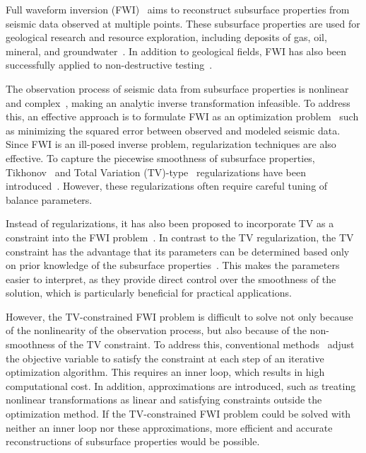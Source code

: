 Full waveform inversion (FWI)~\cite{FWI0,FWI1} aims to reconstruct subsurface properties from seismic data observed at multiple points.
These subsurface properties are used for geological research and resource exploration, including deposits of gas, oil, mineral, and groundwater~\cite{FWI1,FWIApplicationGroundwater0,FWIApplicationGroundwater1}.
In addition to geological fields, FWI has also been successfully applied to non-destructive testing~\cite{FWIApplicationNonDestructiveTesting0,FWIApplicationNonDestructiveTesting1}.

The observation process of seismic data from subsurface properties is nonlinear and complex~\cite{FWI1}, making an analytic inverse transformation infeasible.
To address this, an effective approach is to formulate FWI as an optimization problem~\cite{FWI0,CustomFWI0,CustomFWI1,CustomFWI2,CustomFWI3,CustomFWI4,CustomFWI5} such as minimizing the squared error between observed and modeled seismic data.
Since FWI is an ill-posed inverse problem, regularization techniques are also effective.
To capture the piecewise smoothness of subsurface properties, Tikhonov~\cite{tikhonov} and Total Variation (TV)-type~\cite{TV,TGV} regularizations have been introduced~\cite{FWI-with-tikhonov-regularization,FWI-with-TV-regularization,FWI-with-directional-TV-regularization,FWI-with-high-order-TV-regularization,FWI-with-TGV-regularization}.
However, these regularizations often require careful tuning of balance parameters.

Instead of regularizations, it has also been proposed to incorporate TV as a constraint into the FWI problem~\cite{FWI-with-TV-constraint,FWI-with-TV-constraint2,FWI-with-TV-constraint3}.
In contrast to the TV regularization, the TV constraint has the advantage that its parameters can be determined based only on prior knowledge of the subsurface properties~\cite{constraints-vs-penalties-in-FWI}.
This makes the parameters easier to interpret, as they provide direct control over the smoothness of the solution, which is particularly beneficial for practical applications.

However, the TV-constrained FWI problem is difficult to solve not only because of the nonlinearity of the observation process, but also because of the non-smoothness of the TV constraint.
To address this, conventional methods~\cite{FWI-with-TV-constraint,FWI-with-TV-constraint2,FWI-with-TV-constraint3} adjust the objective variable to satisfy the constraint at each step of an iterative optimization algorithm.
This requires an inner loop, which results in high computational cost.
In addition, approximations are introduced, such as treating nonlinear transformations as linear and satisfying constraints outside the optimization method.
If the TV-constrained FWI problem could be solved with neither an inner loop nor these approximations, more efficient and accurate reconstructions of subsurface properties would be possible.

